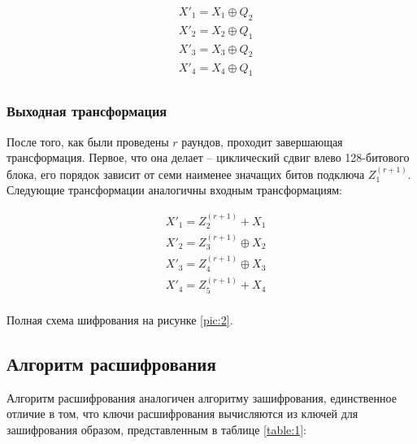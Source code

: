 \documentclass[12pt, a4paper]{article}
\begin{document}
\begin{equation}
\begin{split}
& X'_1 = X_1 \oplus Q_2 \\
& X'_2 = X_2 \oplus Q_1 \\
& X'_3 = X_3 \oplus Q_2 \\
& X'_4 = X_4 \oplus Q_1 \\
\end{split}
\end{equation}

\subsubsection{Выходная трансформация}

После того, как были проведены $r$ раундов, проходит завершающая трансформация. Первое, что она делает -- циклический сдвиг влево 128-битового блока, его порядок зависит от семи наименее значащих битов подключа $Z_1^{(r+1)}$. Следующие трансформации аналогичны входным трансформациям: 

\begin{equation}
\begin{split}
& X'_1 = Z_2^{(r+1)} + X_1 \\
& X'_2 = Z_3^{(r+1)} \oplus X_2 \\
& X'_3 = Z_4^{(r+1)} \oplus X_3 \\
& X'_4 = Z_5^{(r+1)} + X_4 \\
\end{split}
\end{equation}

Полная схема шифрования на рисунке \ref{pic:2}.

\subsection{Алгоритм расшифрования}

Алгоритм расшифрования аналогичен алгоритму зашифрования, единственное отличие в том, что ключи расшифрования вычисляются из ключей для зашифрования образом, представленным в таблице \ref{table:1}:
\end{document}
